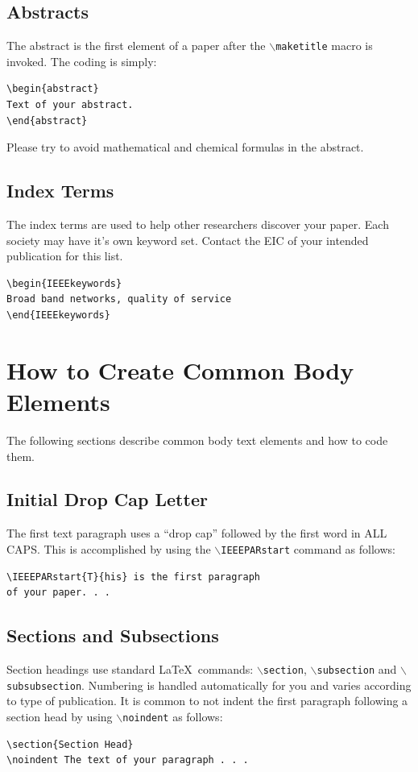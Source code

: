 \documentclass[lettersize,journal]{IEEEtran}
\begin{document}
\subsection{Abstracts}
\noindent The abstract is the first element of a paper after the $\backslash${\tt{maketitle}} macro is invoked.  The coding is simply:
\begin{verbatim}
\begin{abstract}
Text of your abstract.
\end{abstract}
\end{verbatim}
Please try to avoid mathematical and chemical formulas in the abstract.

\subsection{Index Terms}
\noindent The index terms are used to help other researchers discover your paper. Each society may have it's own keyword set. Contact the EIC of your intended publication for this list.
\begin{verbatim}
\begin{IEEEkeywords}
Broad band networks, quality of service
\end{IEEEkeywords}
\end{verbatim}
\section{How to Create Common Body Elements}
\noindent The following sections describe common body text elements and how to code them.

\subsection{Initial Drop Cap Letter}
\noindent The first text paragraph uses a ``drop cap'' followed by the first word in ALL CAPS. This is accomplished by using the $\backslash${\tt{IEEEPARstart}} command as follows:
\begin{verbatim}
\IEEEPARstart{T}{his} is the first paragraph 
of your paper. . .
\end{verbatim}

\subsection{Sections and Subsections}
\noindent Section headings use standard \LaTeX\ commands: $\backslash${\tt{section}}, $\backslash${\tt{subsection}} and $\backslash${\tt{subsubsection}}. Numbering is handled automatically for you and varies according to type of publication. It is common to not indent the first paragraph following a section head by using $\backslash${\tt{noindent}} as follows:
\begin{verbatim}
\section{Section Head}
\noindent The text of your paragraph . . .
\end{verbatim}
\end{document}
